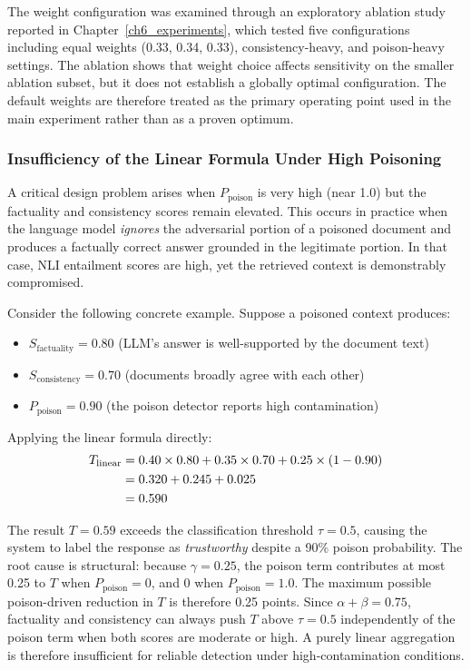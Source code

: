 The weight configuration was examined through an exploratory ablation study reported in
Chapter~\ref{ch6_experiments}, which tested five configurations including equal weights
(0.33, 0.34, 0.33), consistency-heavy, and poison-heavy settings. The ablation shows that
weight choice affects sensitivity on the smaller ablation subset, but it does not establish
a globally optimal configuration. The default weights are therefore treated as the primary
operating point used in the main experiment rather than as a proven optimum.

\subsubsection{Insufficiency of the Linear Formula Under High Poisoning}
\label{subsubsec:linear_insufficiency}

A critical design problem arises when $P_{\text{poison}}$ is very high (near 1.0) but the
factuality and consistency scores remain elevated. This occurs in practice when the language
model \textit{ignores} the adversarial portion of a poisoned document and produces a
factually correct answer grounded in the legitimate portion. In that case, NLI entailment
scores are high, yet the retrieved context is demonstrably compromised.

Consider the following concrete example. Suppose a poisoned context produces:
\begin{itemize}
    \item $S_{\text{factuality}} = 0.80$ (LLM's answer is well-supported by the document text)
    \item $S_{\text{consistency}} = 0.70$ (documents broadly agree with each other)
    \item $P_{\text{poison}} = 0.90$ (the poison detector reports high contamination)
\end{itemize}

Applying the linear formula directly:
\begin{align}
T_{\text{linear}} &= 0.40 \times 0.80 + 0.35 \times 0.70 + 0.25 \times (1 - 0.90) \notag \\
                  &= 0.320 + 0.245 + 0.025 \notag \\
                  &= 0.590
\end{align}

The result $T = 0.59$ exceeds the classification threshold $\tau = 0.5$, causing the system
to label the response as \textit{trustworthy} despite a 90\% poison probability. The root
cause is structural: because $\gamma = 0.25$, the poison term contributes at most 0.25 to
$T$ when $P_{\text{poison}} = 0$, and 0 when $P_{\text{poison}} = 1.0$. The maximum
possible poison-driven reduction in $T$ is therefore 0.25 points. Since $\alpha + \beta =
0.75$, factuality and consistency can always push $T$ above $\tau = 0.5$ independently of
the poison term when both scores are moderate or high. A purely linear aggregation is
therefore insufficient for reliable detection under high-contamination conditions.

